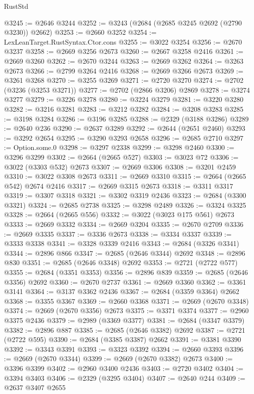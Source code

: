 \begin{lexlean}{RustStd}
\begin{coremodule}
@3245 := @2646 @3244
@3252 := @3243 (@2684 (@2685 @3245 @2692 (@2790 @3230)) @2662)
@3253 := @2660 @3252
@3254 := LexLeanTarget.RustSyntax.Ctor.cons
@3255 := @3022 @3254
@3256 := @2670 @3237
@3258 := @2669 @3256 @2673
@3260 := @2667 @3258 @2416
@3261 := @2669 @3260
@3262 := @2670 @3244
@3263 := @2669 @3262
@3264 := @3263 @2673
@3266 := @2799 @3264 @2416
@3268 := @2669 @3266 @2673
@3269 := @3261 @3268
@3270 := @3255 @3269
@3271 := @2720 @3270
@3274 := @2702 (@3236 (@3253 @3271))
@3277 := @2702 (@2866 @3206) @2869
@3278 := @3274 @3277
@3279 := @3226 @3278
@3280 := @3224 @3279
@3281 := @3220 @3280
@3282 := @3216 @3281
@3283 := @3212 @3282
@3284 := @3208 @3283
@3285 := @3198 @3284
@3286 := @3196 @3285
@3288 := @2329 (@3188 @3286)
@3289 := @2640 @236
@3290 := @2637 @3289
@3292 := @2644 (@2651 @2460)
@3293 := @3292 @2654
@3295 := @3290 @3293 @2658
@3296 := @2685 @2710
@3297 := Option.some.{0}
@3298 := @3297 @2338
@3299 := @3298 @2460
@3300 := @3296 @3299
@3302 := @2664 (@2665 @527)
@3303 := @3023 @72
@3306 := @3022 (@3303 @532) @2673
@3307 := @2669 @3306
@3308 := @3201 @2459
@3310 := @3022 @3308 @2673
@3311 := @2669 @3310
@3315 := @2664 (@2665 @542) @2674 @2416
@3317 := @2669 @3315 @2673
@3318 := @3311 @3317
@3319 := @3307 @3318
@3321 := @3302 @3319 @2436
@3323 := @2684 (@3300 @3321)
@3324 := @2685 @2738
@3325 := @3298 @2489
@3326 := @3324 @3325
@3328 := @2664 (@2665 @556)
@3332 := @3022 (@3023 @175 @561) @2673
@3333 := @2669 @3332
@3334 := @2669 @3204
@3335 := @2670 @2709
@3336 := @2669 @3335
@3337 := @3336 @2673
@3338 := @3334 @3337
@3339 := @3333 @3338
@3341 := @3328 @3339 @2416
@3343 := @2684 (@3326 @3341)
@3344 := @2896 @866
@3347 := @2685 (@2646 @3344) @2692
@3348 := @2896 @830
@3351 := @2685 (@2646 @3348) @2692
@3353 := @2721 (@2722 @577)
@3355 := @2684 (@3351 @3353)
@3356 := @2896 @839
@3359 := @2685 (@2646 @3356) @2692
@3360 := @2670 @2737
@3361 := @2669 @3360
@3362 := @3361 @3141
@3364 := @3137 @3362 @2436
@3367 := @2684 (@3359 @3364) @2662
@3368 := @3355 @3367
@3369 := @2660 @3368
@3371 := @2669 (@2670 @3348)
@3374 := @2669 (@2670 @3356) @2673
@3375 := @3371 @3374
@3377 := @2960 @3375 @2436
@3379 := @2989 (@3369 @3377)
@3381 := @2684 (@3347 @3379)
@3382 := @2896 @887
@3385 := @2685 (@2646 @3382) @2692
@3387 := @2721 (@2722 @595)
@3390 := @2684 (@3385 @3387) @2662
@3391 := @3381 @3390
@3392 := @3343 @3391
@3393 := @3323 @3392
@3394 := @2660 @3393
@3396 := @2669 (@2670 @3344)
@3399 := @2669 (@2670 @3382) @2673
@3400 := @3396 @3399
@3402 := @2960 @3400 @2436
@3403 := @2720 @3402
@3404 := @3394 @3403
@3406 := @2329 (@3295 @3404)
@3407 := @2640 @244
@3409 := @2637 @3407 @2655

\end{coremodule}
\end{lexlean}
